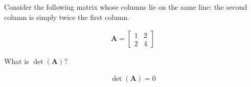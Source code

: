 Consider the following matrix whose columns lie on the same line: the second column is simply twice the first column.

\begin{align*}
    \boldsymbol{A} = \begin{bmatrix}
        1 & 2 \\
        2 & 4
    \end{bmatrix}
\end{align*}

What is $\det(\boldsymbol{A})$?

\begin{solution}
    \begin{align}
        \det(\boldsymbol{A}) = 0
    \end{align}
\end{solution}
